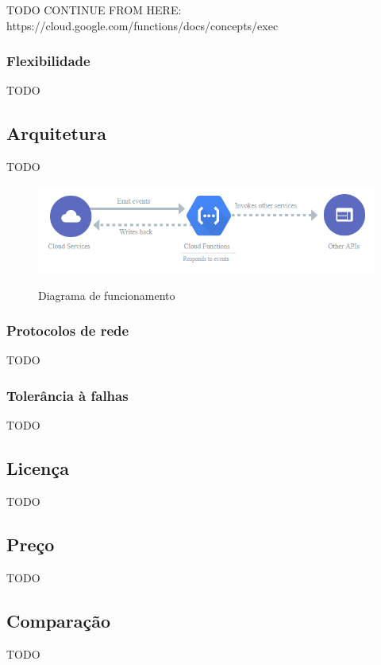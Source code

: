 TODO CONTINUE FROM HERE: https://cloud.google.com/functions/docs/concepts/exec

\subsubsection{Flexibilidade}

TODO

\subsection{Arquitetura}

TODO
\begin{figure}[ht]
	\centering
	\caption{Diagrama de funcionamento}
	\includegraphics[width=12.5cm]{figuras/google-cloud-functions/workflow.png}
	\label{fig:google-cloud-functions-workflow}
\end{figure}

\subsubsection{Protocolos de rede}

TODO

\subsubsection{Tolerância à falhas}

TODO

\subsection{Licença}

TODO

\subsection{Preço}

TODO

\subsection{Comparação}

TODO

